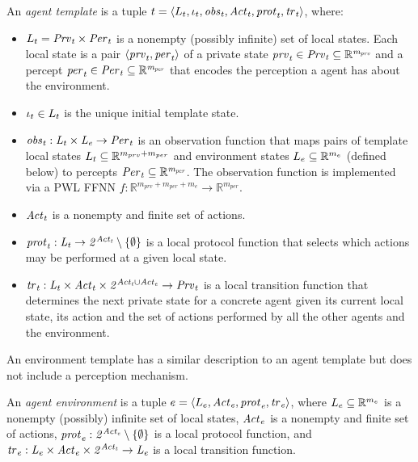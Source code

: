 \begin{definition}
An {\em agent template} is a tuple ${t} = \left \langle L_{t}, \iota_{t}, \it{obs}_{t},
\it{Act}_{t}, \it{prot}_{t}, \it{tr}_{t}  \right \rangle$, where:
\begin{itemize}
  \item $L_{t} = \it{Prv}_{t} \times \it{Per}_{t}$ is a nonempty (possibly infinite)
  set of local states.  Each local state  is a pair $\left \langle \it{prv}_{t}, \it{per}_{t} \right \rangle$ of
  a private state $\it{prv}_{t} \in \it{Prv}_{t} \subseteq \mathbb R^{m_{prv}}$ and a
  percept $\it{per}_{t} \in \it{Per}_{t} \subseteq \mathbb R^{m_{per}}$ that encodes the
  perception a agent has about the environment.  

  \item $\iota_{t} \in L_{t}$ is the unique initial template state.
  
  \item $\it{obs}_{t} : L_{t} \times L_{e} \rightarrow \it{Per}_{t}$ is an
  observation function that maps pairs of template local states $L_{t}
  \subseteq \mathbb{R}^{m_{prv} + m_{per}}$ and environment states $L_{e}
  \subseteq \mathbb{R}^{m_e}$ (defined below) to percepts $\it{Per}_{t} \subseteq
  \mathbb{R}^{m_{per}}$. The observation function is implemented via a PWL FFNN $f :
  \mathbb{R}^{m_{prv} + m_{per} + m_e} \rightarrow \mathbb{R}^{m_{per}}$.

  \item $\it{Act}_{t}$ is a nonempty and finite set of actions.
  
  \item $\it{prot}_{t} : L_{t} \rightarrow 2^{\it{Act}_{t}} \setminus \left \{ \emptyset \right \}$
  is a local protocol function that selects which actions may be performed at a
  given local state.%

  \item $\it{tr}_{t}: L_{t} \times \it{Act}_{t} \times 2^{\it{Act}_{t} \cup \it{Act}_{e}}
  \rightarrow \it{Prv}_{t}$ is a local transition function  that determines the next
  private state for a concrete agent given its current local state, its action
  and the set of actions performed by all the other agents  and the environment.
  
\end{itemize}  
\end{definition}

An environment template has a similar description to an agent template but does
not include a perception mechanism.

\begin{definition}
An {\em agent environment} is a tuple ${e} = \left \langle L_{e}, \it{Act}_{e}, \it{prot}_{e}, \it{tr}_{e}  \right \rangle$, where $L_{e}  \subseteq \mathbb R^{m_e}$ is a nonempty
(possibly) infinite set of local states, $\it{Act}_{e}$ is a nonempty and finite set
of actions,  $\it{prot}_{e} : 2^{\it{Act}_{e}} \setminus \left \{ \emptyset \right \}$ is a local
protocol function, and $\it{tr}_{e} : L_{e} \times \it{Act}_{e} \times 2^{\it{Act}_{t}} 
\rightarrow L_{e}$ is a local transition function.
\end{definition}


